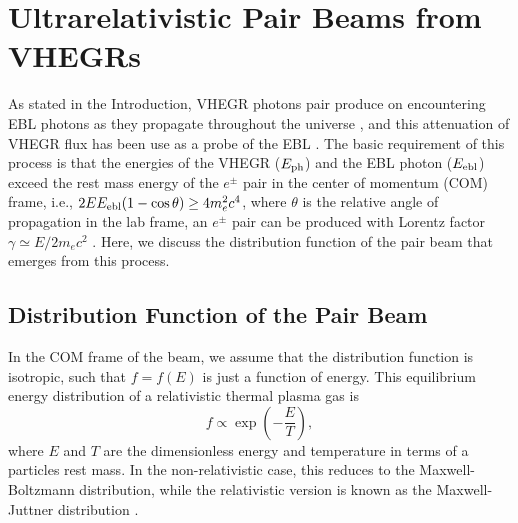 \documentclass[usenatbib,iop,apj]{emulateapj}
\begin{document}
\section{Ultrarelativistic Pair Beams from VHEGRs}\label{sec:setup}

As stated in the Introduction, VHEGR photons pair produce on encountering EBL photons as they propagate throughout the universe \citep{Gould+66}, and this attenuation of VHEGR flux has been use as a probe of the EBL \citep{Stec-deJa-Sala:92,deJa-Stec-Sala:94,Ahar_etal:06}.
The basic requirement of this process is that the energies of the VHEGR ($E_{\rm ph}$) and the EBL photon
  ($E_{\rm ebl}$) exceed the rest mass energy of the $e^\pm$ pair in the center
  of momentum (COM) frame, i.e., $2 E E_{\rm ebl}(1-\cos\theta) \geq 4 m_e^2 c^4$, where
  $\theta$ is the relative angle of propagation in the lab frame, an $e^\pm$
  pair can be produced with Lorentz factor $\gamma\simeq E/2m_e c^2$
  \citep{Goul-Schr:67}.  Here, we discuss the distribution function of the pair beam that emerges from this process.



  

\subsection{Distribution Function of the Pair Beam}

In the COM frame of the beam, we assume that the distribution function is isotropic, such that $f=f(E)$ is just a function of energy.   This equilibrium energy distribution of a relativistic thermal plasma gas is
\begin{equation}\label{eq:relativistic maxwellian}
f\propto \exp\left(-\frac E T\right),
\end{equation}
 where $E$ and $T$ are the dimensionless energy and temperature in terms of a particles rest mass.  In the non-relativistic case, this reduces to the Maxwell-Boltzmann distribution, while the relativistic version is known as the Maxwell-Juttner distribution \citep{1911AnP...340..145J}. 
\end{document}

